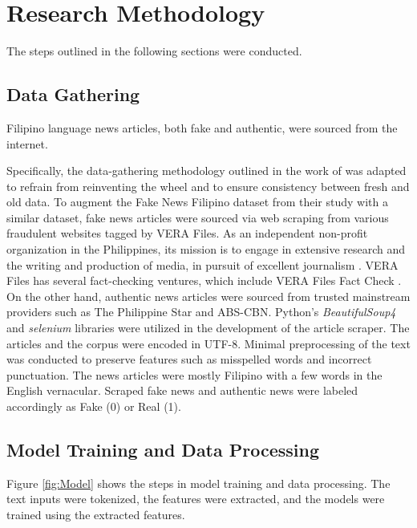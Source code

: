 \chapter{Research Methodology}

The steps outlined in the following sections were conducted.

\section{Data Gathering}

Filipino language news articles, both fake and authentic, were sourced from the internet.

Specifically, the data-gathering methodology outlined in the work of \cite{cruz2020localization} was adapted to refrain from reinventing the wheel and to ensure consistency between fresh and old data. To augment the Fake News Filipino dataset from their study with a similar dataset, fake news articles were sourced via web scraping from various fraudulent websites tagged by VERA Files. As an independent non-profit organization in the Philippines, its mission is to engage in extensive research and the writing and production of media, in pursuit of excellent journalism \cite{verafiles-about}. VERA Files has several fact-checking ventures, which include VERA Files Fact Check \cite{verafiles-fact-check}. On the other hand, authentic news articles were sourced from trusted mainstream providers such as The Philippine Star and ABS-CBN. Python's \textit{BeautifulSoup4} and \textit{selenium} libraries were utilized in the development of the article scraper. The articles and the corpus were encoded in UTF-8. Minimal preprocessing of the text was conducted to preserve features such as misspelled words and incorrect punctuation. The news articles were mostly Filipino with a few words in the English vernacular. Scraped fake news and authentic news were labeled accordingly as Fake (0) or Real (1).

\section{Model Training and Data Processing}
\label{sec:ModelTraining}

Figure \ref{fig:Model} shows the steps in model training and data processing. The text inputs were tokenized, the features were extracted, and the models were trained using the extracted features.

